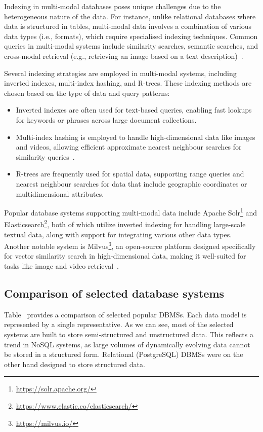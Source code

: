Indexing in multi-modal databases poses unique challenges due to the heterogeneous nature of the data. For instance, unlike relational databases where data is structured in tables, multi-modal data involves a combination of various data types (i.e., formats), which require specialised indexing techniques. Common queries in multi-modal systems include similarity searches, semantic searches, and cross-modal retrieval (e.g., retrieving an image based on a text description)~\citep{DBLP:journals/corr/WangY0W016}.

Several indexing strategies are employed in multi-modal systems, including inverted indexes, multi-index hashing, and R-trees. These indexing methods are chosen based on the type of data and query patterns:
\begin{itemize}
    \item Inverted indexes are often used for text-based queries, enabling fast lookups for keywords or phrases across large document collections.

    \item Multi-index hashing is employed to handle high-dimensional data like images and videos, allowing efficient approximate nearest neighbour searches for similarity queries~\citep{DBLP:journals/corr/WangSSJ14}.

    \item R-trees are frequently used for spatial data, supporting range queries and nearest neighbour searches for data that include geographic coordinates or multidimensional attributes.
\end{itemize}

Popular database systems supporting multi-modal data include Apache Solr\footnote{\url{https://solr.apache.org/}} and Elasticsearch\footnote{\url{https://www.elastic.co/elasticsearch/}}, both of which utilize inverted indexing for handling large-scale textual data, along with support for integrating various other data types. Another notable system is Milvus\footnote{\url{https://milvus.io/}}, an open-source platform designed specifically for vector similarity search in high-dimensional data, making it well-suited for tasks like image and video retrieval~\citep{DBLP:conf/sigmod/WangYGJXLWGLXYY21}.

\subsection{Comparison of selected database systems}

Table~ provides a comparison of selected popular DBMSs. Each data model is represented by a single representative. As we can see, most of the selected systems are built to store semi-structured and unstructured data. This reflects a trend in NoSQL systems, as large volumes of dynamically evolving data cannot be stored in a structured form. Relational (PostgreSQL) DBMSs were on the other hand designed to store structured data.

